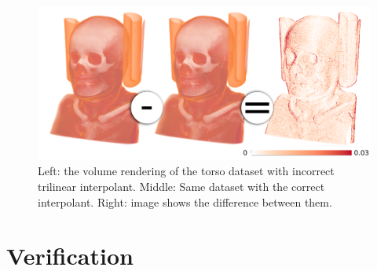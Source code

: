 \begin{figure}
\centering
\includegraphics[width=1\linewidth]{chapter5/figures/torso-image.png}
\caption{\label{fig:error-quantification-examples}  Left: 
  the volume rendering of the torso dataset with incorrect trilinear
  interpolant. Middle: Same dataset with the correct 
  interpolant. Right:  image shows
  the difference between them.}
\end{figure}

\section{Verification}
\label{sec:verification}

